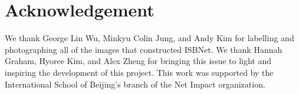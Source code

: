 \documentclass[conference]{ieeeconf}
\begin{document}
\section*{Acknowledgement}

We thank George Lin Wu, Minkyu Colin Jung, and Andy Kim for labelling and photographing all of the images that constructed ISBNet. We thank Hannah Graham, Hyoree Kim, and Alex Zheng for bringing this issue to light and inspiring the development of this project. This work was supported by the International School of Beijing's branch of the Net Impact organization.




\end{document}
